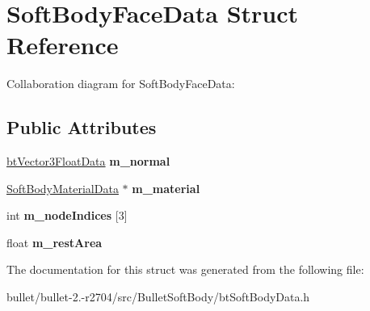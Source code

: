 \hypertarget{struct_soft_body_face_data}{\section{Soft\+Body\+Face\+Data Struct Reference}
\label{struct_soft_body_face_data}
}


Collaboration diagram for Soft\+Body\+Face\+Data\+:
\subsection*{Public Attributes}
\begin{DoxyCompactItemize}
\item 
\hypertarget{struct_soft_body_face_data_a0571d9b6ae94d31ed8687c3ba9bb5225}{\hyperlink{structbt_vector3_float_data}{bt\+Vector3\+Float\+Data} {\bfseries m\+\_\+normal}}\label{struct_soft_body_face_data_a0571d9b6ae94d31ed8687c3ba9bb5225}

\item 
\hypertarget{struct_soft_body_face_data_a6e9f3df3ab6ff0e79464b4ac49702db0}{\hyperlink{struct_soft_body_material_data}{Soft\+Body\+Material\+Data} $\ast$ {\bfseries m\+\_\+material}}\label{struct_soft_body_face_data_a6e9f3df3ab6ff0e79464b4ac49702db0}

\item 
\hypertarget{struct_soft_body_face_data_aa3c85d456d0ff5ff8184788765c5f937}{int {\bfseries m\+\_\+node\+Indices} \mbox{[}3\mbox{]}}\label{struct_soft_body_face_data_aa3c85d456d0ff5ff8184788765c5f937}

\item 
\hypertarget{struct_soft_body_face_data_af1735e28f48b38fe1df6a27b9ac44c90}{float {\bfseries m\+\_\+rest\+Area}}\label{struct_soft_body_face_data_af1735e28f48b38fe1df6a27b9ac44c90}

\end{DoxyCompactItemize}


The documentation for this struct was generated from the following file\+:\begin{DoxyCompactItemize}
\item 
bullet/bullet-\/2.-\/r2704/src/\+Bullet\+Soft\+Body/bt\+Soft\+Body\+Data.\+h\end{DoxyCompactItemize}
